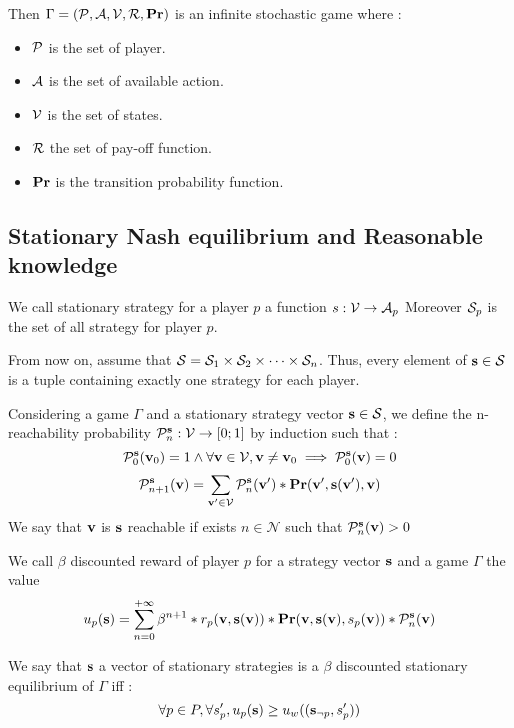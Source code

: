 Then $\Gamma = (\mathcal{P},\mathcal{A},\mathcal{V},\mathcal{R},\mathbf{Pr})$ is an infinite stochastic game where :
\begin{itemize}
	\item $\mathcal{P}$ is the set of player.
	\item $\mathcal{A}$ is the set of available action.
	\item $\mathcal{V}$ is the set of states.
	\item $\mathcal{R}$ the set of pay-off function.
	\item $\mathbf{Pr}$ is the transition probability function.
\end{itemize} 


\subsection{Stationary Nash equilibrium and Reasonable knowledge}

\begin{mydef}
	We call stationary strategy for a player $p$ a function $s : \mathcal{V} \rightarrow \mathcal{A}_p$ 
	Moreover $\mathcal{S}_p$ is the set of all strategy for player $p$. 
\end{mydef}
From now on, assume that $\mathcal{S} = \mathcal{S}_{1} \times \mathcal{S}_{2} \times \cdots \times \mathcal{S}_{n}$. Thus, every element of $\mathbf{s} \in \mathcal{S}$ is a tuple containing exactly one strategy for each player.

\begin{mydef}
	Considering a game $\Gamma$ and a stationary strategy vector $\mathbf{s} \in \mathcal{S}$, 
	we define the n-reachability probability $\mathcal{P}^{\mathbf{s}}_n : \mathcal{V} \rightarrow [0;1]$ by induction such that :
	$$\mathcal{P}^{\mathbf{s}}_0(\mathbf{v}_0) = 1 \land \forall \mathbf{v} \in \mathcal{V},  \mathbf{v} \neq \mathbf{v}_0 \implies \mathcal{P}^{\mathbf{s}}_0(\mathbf{v}) = 0$$
	$$\mathcal{P}^{\mathbf{s}}_{n+1}(\mathbf{v}) = \sum_{\mathbf{v}' \in \mathcal{V}} \mathcal{P}^{\mathbf{s}}_{n}(\mathbf{v}') * \mathbf{Pr}(\mathbf{v}',\mathbf{s}(\mathbf{v}'),\mathbf{v})$$
	We say that $\mathbf{v}$ is $\mathbf{s}$ reachable if exists $n \in \mathcal{N}$ such that $\mathcal{P}^{\mathbf{s}}_{n}(\mathbf{v}) > 0$
\end{mydef}


\begin{mydef}
	We call $\beta$ discounted reward of player $p$ for a strategy vector $\mathbf{s}$ and a game $\Gamma$ the value 
	$$u_p(\mathbf{s}) = 	\sum_{n=0}^{+\infty}\beta^{n+1} * r_p(\mathbf{v},\mathbf{s}(\mathbf{v})) * \mathbf{Pr}(\mathbf{v},\mathbf{s}(\mathbf{v}),s_p(\mathbf{v}))*\mathcal{P}^{\mathbf{s}}_{n}(\mathbf{v}) $$
\end{mydef}

\begin{mydef}
	We say that $\mathbf{s}$ a vector of stationary strategies is a $\beta$ discounted stationary equilibrium of $\Gamma$ iff : 
	$$\forall p \in P, \forall s'_p,  u_p(\mathbf{s}) \geq u_w((\mathbf{s}_{\neg p},s'_p)) $$
\end{mydef}


